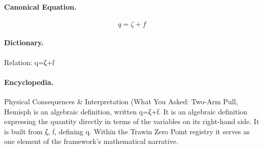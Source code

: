 \paragraph{Canonical Equation.}
\[
q=\zeta+f
\]

\paragraph{Dictionary.}
Relation: q=ζ+f

\paragraph{Encyclopedia.}
Physical Consequences \& Interpretation (What You Asked: Two-Arm Pull, Hemisph is an algebraic definition, written q=ζ+f. It is an algebraic definition expressing the quantity directly in terms of the variables on its right-hand side. It is built from ζ, f, defining q. Within the Trawin Zero Point registry it serves as one element of the framework's mathematical narrative.
